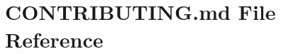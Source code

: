 \hypertarget{CONTRIBUTING_8md}{}\section{C\+O\+N\+T\+R\+I\+B\+U\+T\+I\+N\+G.\+md File Reference}
\label{CONTRIBUTING_8md}
